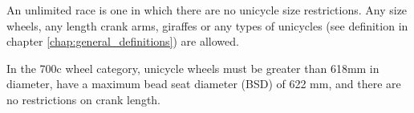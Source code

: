 An unlimited race is one in which there are no unicycle size restrictions.
Any size wheels, any length crank arms, giraffes or any types of unicycles (see definition in chapter \ref{chap:general_definitions}) are allowed.

In the 700c wheel category, unicycle wheels must be greater than 618mm in diameter, have a maximum bead seat diameter (BSD) of 622 mm, and there are no restrictions on crank length.
